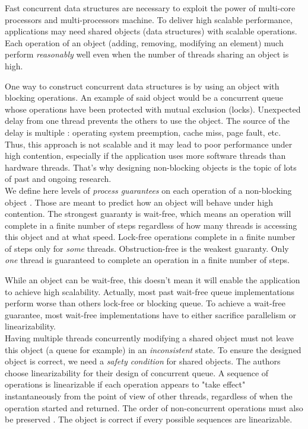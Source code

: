 Fast concurrent data structures are necessary to exploit the power of multi-core
processors and multi-processors machine. To deliver high scalable performance,
applications may need shared objects (data structures) with scalable operations.
Each operation of an object (adding, removing, modifying an element) much
perform \textit{reasonably} well even when the number of threads sharing an
object is high.

One way to construct concurrent data structures is by using an object with
blocking operations. An example of said object would be a concurrent queue whose
operations have been protected with mutual exclusion (locks). Unexpected delay
from one thread prevents the others to use the object. The source of the delay
is multiple : operating system preemption, cache miss, page fault, etc. Thus,
this approach is not scalable and it may lead to poor performance under high
contention, especially if the application uses more software threads than
hardware threads. That's why designing non-blocking objects is the topic of lots
of past and ongoing research. \\

 We define here levels of \textit{process guarantees} on
each operation of a non-blocking object \cite{Yang:2016:WQF:3016078.2851168}.
Those are meant to predict how an object will behave under high contention. The
strongest guaranty is wait-free, which means an operation will complete in a
finite number of steps regardless of how many threads is accessing this object
and at what speed. Lock-free operations complete in a finite number of steps
only for \textit{some} threads. Obstruction-free is the weakest guaranty. Only
\textit{one} thread is guaranteed to complete an operation in a finite number of
steps.

While an object can be wait-free, this doesn't mean it will enable the
application to achieve high scalability. Actually, most past wait-free queue
implementations perform worse than others lock-free or blocking queue. To
achieve a wait-free guarantee, most wait-free implementations have to either
sacrifice parallelism or linearizability. \\

 Having multiple threads concurrently modifying a shared
object must not leave this object (a queue for example) in an
\textit{inconsistent} state. To ensure the designed object is correct, we need a
\textit{safety condition} for shared objects. The authors choose linearizability
for their design of concurrent queue. A sequence of operations is linearizable
if each operation appears to "take effect" instantaneously from the point of
view of other threads, regardless of when the operation started and returned.
The order of non-concurrent operations must also be preserved
\cite{Herlihy:1990:LCC:78969.78972}. The object is correct if every possible
sequences are linearizable.

